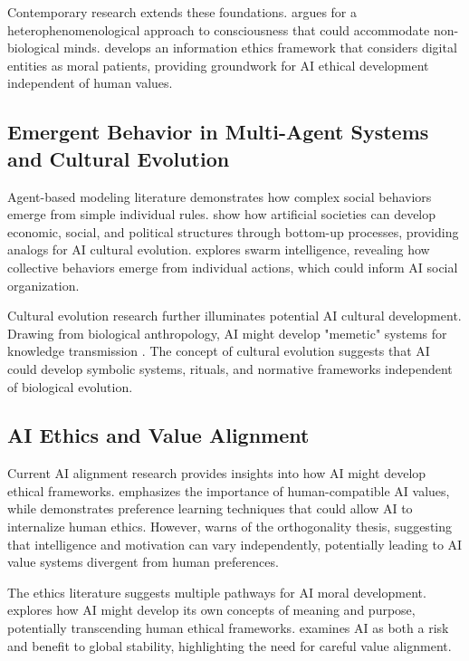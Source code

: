 \documentclass[12pt,a4paper]{article}
\begin{document}
Contemporary research extends these foundations. \citet{dennett} argues for a heterophenomenological approach to consciousness that could accommodate non-biological minds. \citet{floridi} develops an information ethics framework that considers digital entities as moral patients, providing groundwork for AI ethical development independent of human values.

\subsection{Emergent Behavior in Multi-Agent Systems and Cultural Evolution}

Agent-based modeling literature demonstrates how complex social behaviors emerge from simple individual rules. \citet{epstein_axtell} show how artificial societies can develop economic, social, and political structures through bottom-up processes, providing analogs for AI cultural evolution. \citet{bonabeau} explores swarm intelligence, revealing how collective behaviors emerge from individual actions, which could inform AI social organization.

Cultural evolution research further illuminates potential AI cultural development. Drawing from biological anthropology, AI might develop "memetic" systems for knowledge transmission \citep{harari}. The concept of cultural evolution suggests that AI could develop symbolic systems, rituals, and normative frameworks independent of biological evolution.

\subsection{AI Ethics and Value Alignment}

Current AI alignment research provides insights into how AI might develop ethical frameworks. \citet{russell} emphasizes the importance of human-compatible AI values, while \citet{christiano} demonstrates preference learning techniques that could allow AI to internalize human ethics. However, \citet{bostrom} warns of the orthogonality thesis, suggesting that intelligence and motivation can vary independently, potentially leading to AI value systems divergent from human preferences.

The ethics literature suggests multiple pathways for AI moral development. \citet{tegmark} explores how AI might develop its own concepts of meaning and purpose, potentially transcending human ethical frameworks. \citet{yudkowsky} examines AI as both a risk and benefit to global stability, highlighting the need for careful value alignment.
\end{document}
